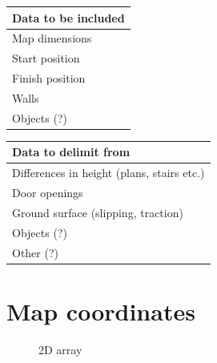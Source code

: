 \begin{center}
	\begin{tabular}{|l|}
		\hline
		Data to be included \\ 
		\hline
		Map dimensions \\
		Start position \\
		Finish position \\
		Walls \\
		Objects (?) \\
		\hline
	\end{tabular}
	\begin{tabular}{|l|}
		\hline
		Data to delimit from \\ 
		\hline
		Differences in height (plans, stairs etc.) \\
		Door openings \\
		Ground surface (slipping, traction) \\
		Objects (?) \\
		Other (?) \\
		\hline
	\end{tabular}
	\label{table:map_data}
\end{center}


\section{Map coordinates}
\label{sec:map_coordinates} %

\begin{figure}[htp]
    \centering
    \caption{2D array}
    \label{fig:2d-array}
\end{figure}

